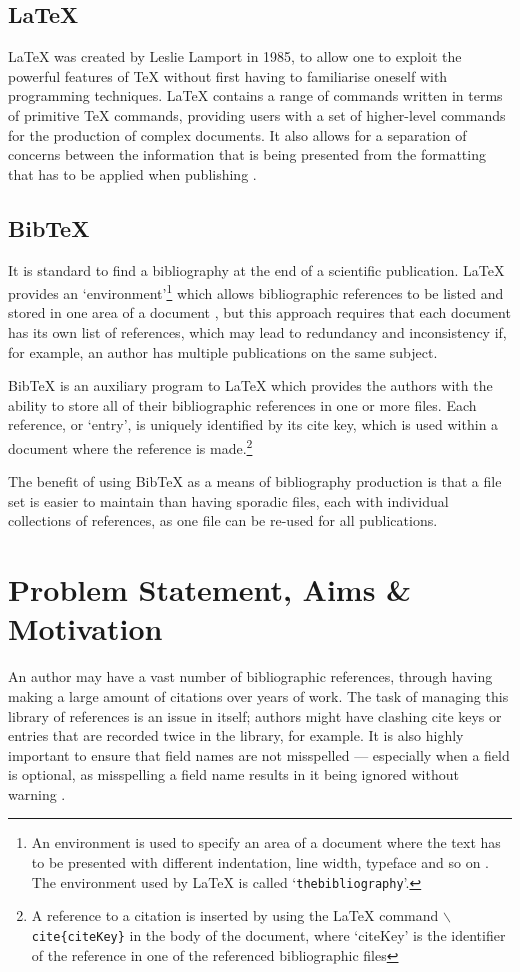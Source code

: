 \documentclass{l4proj}
\newcommand{\BibTeX}{B{\sc ib}\TeX}
\newcommand{\bibtex}{\BibTeX}
\newcommand{\latex}{\LaTeX{} }
\begin{document}
\subsection{\LaTeX}
\latex was created by Leslie Lamport in 1985, to allow one to exploit the powerful features of \TeX{} without first having to familiarise oneself with programming techniques. \latex contains a range of commands written in terms of primitive \TeX{} commands, providing users with a set of higher-level commands for the production of complex documents.  It also allows for a separation of concerns between the information that is being presented from the formatting that has to be applied when publishing \cite{KD95}.

\subsection{\bibtex}
It is standard to find a bibliography at the end of a scientific publication. \latex provides an `environment'\footnote{An environment is used to specify an area of a document where the text has to be presented with different indentation, line width, typeface and so on \cite{KD95}.  The environment used by \latex is called `\texttt{thebibliography}'.} which allows bibliographic references to be listed and stored in one area of a document \cite{KD95}, but this approach requires that each document has its own list of references, which may lead to redundancy and inconsistency if, for example, an author has multiple publications on the same subject. 

\bibtex{} is an auxiliary program to \latex which provides the authors with the ability to store all of their bibliographic references in one or more files.  Each reference, or `entry', is uniquely identified by its cite key, which is used within a document where the reference is made.\footnote{A reference to a citation is inserted by using the \latex command \texttt{$\backslash$cite\{citeKey\}} in the body of the document, where `citeKey' is the identifier of the reference in one of the referenced bibliographic files}

The benefit of using \bibtex{} as a means of bibliography production is that a file set is easier to maintain than having sporadic files, each with individual collections of references, as one file can be re-used for all publications.

\section{Problem Statement, Aims \& Motivation}
An author may have a vast number of bibliographic references, through having making a large amount of citations over years of work.  The task of managing this library of references is an issue in itself; authors might have clashing cite keys or entries that are recorded twice in the library, for example.  It is also highly important to ensure that field names are not misspelled --- especially when a field is optional, as misspelling a field name results in it being ignored without warning \cite{OP88}.
\end{document}
